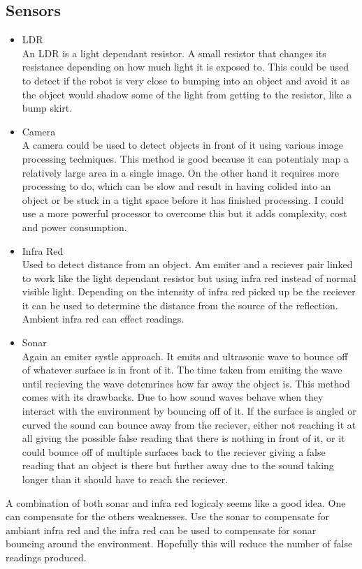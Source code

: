 \subsection{Sensors}

\begin{itemize}
\item LDR
\\An LDR is a light dependant resistor.  A small resistor that changes its resistance depending on how much light it is exposed to.  This could be used to detect if the robot is very close to bumping into an object and avoid it as the object would shadow some of the light from getting to the resistor, like a bump skirt.

\item Camera
\\A camera could be used to detect objects in front of it using various image processing techniques.  This method is good because it can potentialy map a relatively large area in a single image.  On the other hand it requires more processing to do, which can be slow and result in having colided into an object or be stuck in a tight space before it has finished processing.  I could use a more powerful processor to overcome this but it adds complexity, cost and power consumption.

\item Infra Red
\\Used to detect distance from an object.  Am emiter and a reciever pair linked to work like the light dependant resistor but using infra red instead of normal visible light.  Depending on the intensity of infra red picked up be the reciever it can be used to determine the distance from the source of the reflection.  Ambient infra red can effect readings.

\item Sonar
\\Again an emiter systle approach.  It emits and ultrasonic wave to bounce off of whatever surface is in front of it.  The time taken from emiting the wave until recieving the wave detemrines how far away the object is.  This method comes with its drawbacks.  Due to how sound waves behave when they interact with the environment by bouncing off of it.  If the surface is angled or curved the sound can bounce away from the reciever, either not reaching it at all giving the possible false reading that there is nothing in front of it, or it could bounce off of multiple surfaces back to the reciever giving a false reading that an object is there but further away due to the sound taking longer than it should have to reach the reciever.

\end{itemize}
A combination of both sonar and infra red logicaly seems like a good idea.  One can compensate for the others weaknesses.  Use the sonar to compensate for ambiant infra red and the infra red can be used to compensate for sonar bouncing around the environment.  Hopefully this will reduce the number of false readings produced.

